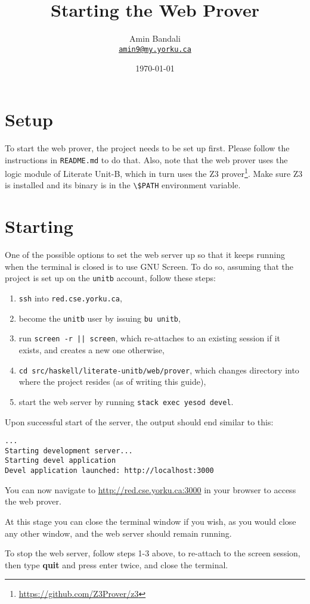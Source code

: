 \documentclass{article}
\title{Starting the Web Prover}
\author{
  Amin Bandali
  \\
  \href{mailto:amin9@my.yorku.ca}
  {\normalsize\texttt{amin9@my.yorku.ca}}
}
\date{\today}
\newcommand{\code}[1]
{\colorbox{code-bg}{\lstinline[style=inline]!#1!}}
\begin{document}
\setlength{\droptitle}{-2cm}

\maketitle

\section{Setup}

To start the web prover, the project needs to be set up first. Please follow the
instructions in \verb#README.md# to do that. Also, note that the web prover
uses the logic module of Literate Unit-B, which in turn uses the Z3
prover\footnote{\url{https://github.com/Z3Prover/z3}}. Make
sure Z3 is installed and its binary is in the \code{\$PATH} environment variable.

\section{Starting}

One of the possible options to set the web server up so that it keeps running
when the terminal is closed is to use GNU Screen. To do so, assuming that the
project is set up on the \verb#unitb# account, follow these steps:

\begin{enumerate}
\item \verb#ssh# into \code{red.cse.yorku.ca},

\item become the \verb#unitb# user by issuing \code{bu unitb},

\item run \code{screen -r || screen}, which re-attaches to an existing session
  if it exists, and creates a new one otherwise,

\item \code{cd src/haskell/literate-unitb/web/prover}, which changes directory
  into where the project resides (as of writing this guide),

\item start the web server by running \code{stack exec yesod devel}.
\end{enumerate}

Upon successful start of the server, the output should end similar to this:

\begin{verbatim}
...
Starting development server...
Starting devel application
Devel application launched: http://localhost:3000
\end{verbatim}

You can now navigate to \url{http://red.cse.yorku.ca:3000} in your browser to
access the web prover.\newline

At this stage you can close the terminal window if you wish, as you would close
any other window, and the web server should remain running.\newline

To stop the web server, follow steps 1-3 above, to re-attach to the screen
session, then type \textbf{quit} and press enter twice, and close the terminal.
\end{document}
